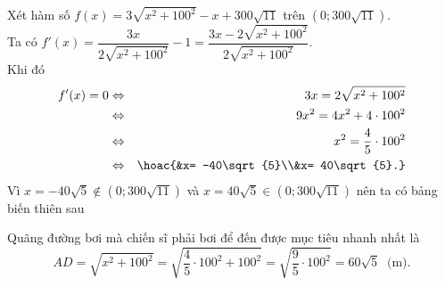 \begin{ex}
{		Xét hàm số $f(x) = 3\sqrt{x^2 + 100^2} - x  + 300\sqrt{11}$ trên $\left(0; 300\sqrt{11}\right)$.\\
		Ta có $f'(x) = \dfrac{3x}{2\sqrt{x^2+100^2}} - 1 = \dfrac{3x - 2\sqrt{x^2 + 100^2}}{2\sqrt{x^2  + 100^2}}$.\\
		 Khi đó
		\begin{eqnarray*}
			f'(x) =  0 &\Leftrightarrow& 3x = 2\sqrt{x^2+100^2}\\
			& \Leftrightarrow& 9x^2 = 4x^2 +  4 \cdot 100^2 \\
			&\Leftrightarrow& x^2 = \dfrac{4}{5} \cdot 100^2\\ 
			& \Leftrightarrow& \hoac{&x= -40\sqrt{5}\\&x= 40\sqrt{5}.} 
		\end{eqnarray*}
		Vì $x= -40\sqrt{5} \notin \left(0; 300\sqrt{11}\right)$ và $x= 40\sqrt{5} \in \left(0; 300\sqrt{11}\right)$ nên  ta có bảng biến thiên sau
		\begin{center}
			\begin{center}
			\end{center}
		\end{center}
		Quãng đường bơi mà chiến sĩ  phải bơi để đến được mục tiêu nhanh nhất là
		$$AD  = \sqrt{x^2+100^2} = \sqrt{\dfrac{4}{5} \cdot 100^2 + 100^2} = \sqrt{\dfrac{9}{5} \cdot 100^2} = 60\sqrt{5} \ \text{ (m)}.$$
	 }
\end{ex}

